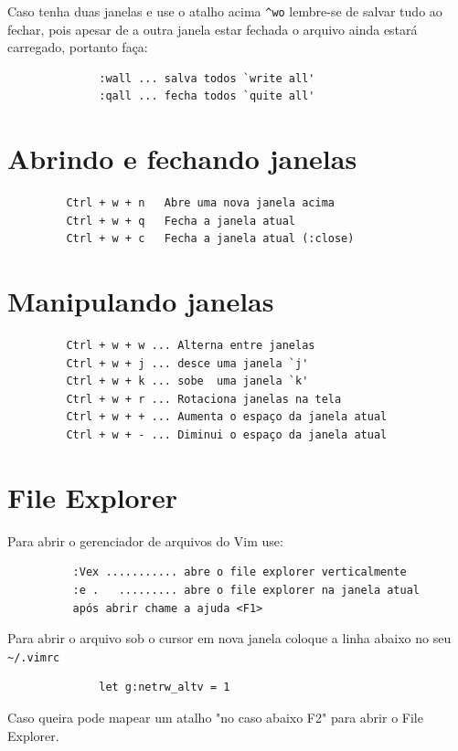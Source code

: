 \documentclass[10pt,a4paper,openany]{book}
\begin{document}
Caso tenha duas janelas e use o atalho acima \verb|^wo| lembre-se de salvar
tudo ao fechar, pois apesar de a outra janela estar fechada o arquivo
ainda estará carregado, portanto faça:

\begin{verbatim}
			  :wall ... salva todos `write all'
			  :qall ... fecha todos `quite all'
\end{verbatim}

\section{Abrindo e fechando janelas }

\begin{verbatim}
		 Ctrl + w + n   Abre uma nova janela acima
		 Ctrl + w + q   Fecha a janela atual
		 Ctrl + w + c   Fecha a janela atual (:close)
\end{verbatim}

\section{Manipulando janelas }

\begin{verbatim}
		 Ctrl + w + w ... Alterna entre janelas
		 Ctrl + w + j ... desce uma janela `j'
		 Ctrl + w + k ... sobe  uma janela `k'
		 Ctrl + w + r ... Rotaciona janelas na tela
		 Ctrl + w + + ... Aumenta o espaço da janela atual
		 Ctrl + w + - ... Diminui o espaço da janela atual
\end{verbatim}

\section{File Explorer }
\label{File Explorer }
Para abrir o gerenciador de arquivos do Vim use:

\begin{verbatim}
		  :Vex ........... abre o file explorer verticalmente
		  :e .   ......... abre o file explorer na janela atual
		  após abrir chame a ajuda <F1>
\end{verbatim}

Para abrir o arquivo sob o cursor em nova janela coloque a linha abaixo no seu \verb|~/.vimrc|

\begin{verbatim}
			  let g:netrw_altv = 1
\end{verbatim}

Caso queira pode mapear um atalho "no caso abaixo F2" para abrir o File Explorer.
\end{document}
